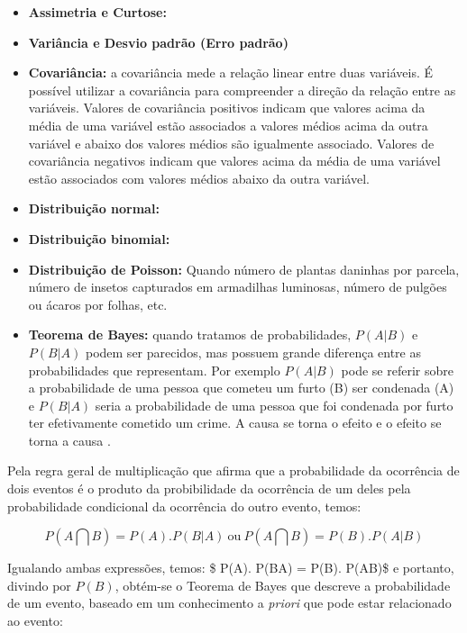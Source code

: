 \documentclass[
]{book}
\begin{document}
\begin{itemize}
\item
  \textbf{Assimetria e Curtose:}
\item
  \textbf{Variância e Desvio padrão (Erro padrão)}
\item
  \textbf{Covariância:} a covariância mede a relação linear entre duas variáveis. É possível utilizar a covariância para compreender a direção da relação entre as variáveis. Valores de covariância positivos indicam que valores acima da média de uma variável estão associados a valores médios acima da outra variável e abaixo dos valores médios são igualmente associado. Valores de covariância negativos indicam que valores acima da média de uma variável estão associados com valores médios abaixo da outra variável.
\item
  \textbf{Distribuição normal:}
\item
  \textbf{Distribuição binomial:}
\item
  \textbf{Distribuição de Poisson:} \citep{banzatto1992experimentaccao} Quando número de plantas daninhas por parcela, número de insetos capturados em armadilhas luminosas, número de pulgões ou ácaros por folhas, etc.
\item
  \textbf{Teorema de Bayes:} quando tratamos de probabilidades, \(P(A|B)\) e \(P(B|A)\) podem ser parecidos, mas possuem grande diferença entre as probabilidades que representam. Por exemplo \(P(A|B)\) pode se referir sobre a probabilidade de uma pessoa que cometeu um furto (B) ser condenada (A) e \(P(B|A)\) seria a probabilidade de uma pessoa que foi condenada por furto ter efetivamente cometido um crime. A causa se torna o efeito e o efeito se torna a causa \citep{freund2009estatistica}.
\end{itemize}

Pela regra geral de multiplicação que afirma que a probabilidade da ocorrência de dois eventos é o produto da probibilidade da ocorrência de um deles pela probabilidade condicional da ocorrência do outro evento, temos:

\begin{equation} 
 P(A \bigcap B)= P(A). P(B|A) \  \mbox{ou} \ P(A \bigcap B)= P(B). P(A|B)
  \label{eq:multprob}
\end{equation}

Igualando ambas expressões, temos: \$ P(A). P(B\textbar{}A) = P(B). P(A\textbar{}B)\$ e portanto, divindo por \(P(B)\), obtém-se o Teorema de Bayes que descreve a probabilidade de um evento, baseado em um conhecimento a \emph{priori} que pode estar relacionado ao evento:
\end{document}
